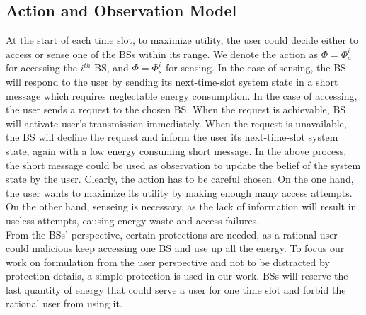 \documentclass[conference]{IEEEtran}
\begin{document}
\subsection{Action and Observation Model}
At the start of each time slot,
to maximize utility, the user could decide either to access or sense one of the BSs within its range.
We denote the action as \(\Phi = \Phi_{a}^i\) for accessing the \(i^{th}\) BS,
and \(\Phi = \Phi_{s}^i\) for sensing.
In the case of sensing,
the BS will respond to the user by sending its next-time-slot system state
in a short message which requires neglectable energy consumption.
In the case of accessing, the user sends a request to the chosen BS.
When the request is achievable, BS will activate user's transmission immediately.
When the request is unavailable, the BS will decline the request and
inform the user its next-time-slot system state, again with a low energy consuming short message.
In the above process, the short message could
be used as observation to update the belief of the system state by the user.
Clearly, the action has to be careful chosen.
On the one hand, the user wants to maximize its utility by making enough many access attempts.
On the other hand, senseing is necessary, 
as the lack of information will result in useless attempts, causing energy waste and access failures.\\
\indent
From the BSs' perspective, certain protections are needed,
as a rational user could malicious keep accessing one BS and use up all the energy.
To focus our work on formulation from the user perspective and
not to be distracted by protection details,
a simple protection is used in our work.
BSs will reserve the last quantity of energy that could serve a user
for one time slot and forbid the rational user from using it.
\end{document}
